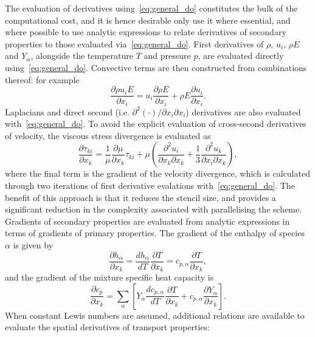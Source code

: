 \documentclass[notitlepage]{revtex4-1}
\begin{document}
The evaluation of derivatives using~\eqref{eq:general_do} constitutes the bulk of the computational cost, and it is hence desirable only use it where essential, and where possible to use analytic expressions to relate derivatives of secondary properties to those evaluated via~\eqref{eq:general_do}. First derivatives of $\rho$, ${u}_{i}$, $\rho{E}$ and ${Y}_{\alpha}$, alongside the temperature $T$ and pressure $p$, are evaluated directly using~\eqref{eq:general_do}. Convective terms are then constructed from combinations thereof: for example
\begin{equation}\frac{\partial\rho{u}_{i}E}{\partial{x}_{i}}=u_{i}\frac{\partial\rho{E}}{\partial{x}_{i}}+\rho{E}\frac{\partial{u}_{i}}{\partial{x}_{i}}.\end{equation}
Laplacians and direct second (i.e. $\partial^{2}\left(\cdot\right)/\partial{x}_{i}\partial{x}_{i}$) derivatives are also evaluated with~\eqref{eq:general_do}. To avoid the explicit evaluation of cross-second derivatives of velocity, the viscous stress divergence is evaluated as
\begin{equation}\frac{\partial\tau_{ki}}{\partial{x}_{k}}=\frac{1}{\mu}\frac{\partial\mu}{\partial{x}_{k}}\tau_{ki}+\mu\left(\frac{\partial^{2}{u}_{i}}{\partial{x}_{k}\partial{x}_{k}}+\frac{1}{3}\frac{\partial^{2}{u}_{k}}{\partial{x}_{i}\partial{x}_{k}}\right)\label{eq:divtau},\end{equation}
where the final term is the gradient of the velocity divergence, which is calculated through two iterations of first derivative evalations with~\eqref{eq:general_do}. The benefit of this approach is that it reduces the stencil size, and provides a significant reduction in the complexity associated with parallelising the scheme. Gradients of secondary properties are evaluated from analytic expressions in terms of gradients of primary properties. The gradient of the enthalpy of species $\alpha$ is given by
\begin{equation}\frac{\partial{h}_{\alpha}}{\partial{x}_{k}}=\frac{dh_{\alpha}}{dT}\frac{\partial{T}}{\partial{x}_{k}}=c_{p,\alpha}\frac{\partial{T}}{\partial{x}_{k}},\end{equation}
and the gradient of the mixture specific heat capacity is
\begin{equation}\frac{\partial{c}_{p}}{\partial{x}_{k}}=\displaystyle\sum_{\alpha}\left[Y_{\alpha}\frac{dc_{p,\alpha}}{dT}\frac{\partial{T}}{\partial{x}_{k}}+c_{p,\alpha}\frac{\partial{Y}_{\alpha}}{\partial{x}_{k}}\right].\end{equation}
When constant Lewis numbers are assumed, additional relations are available to evaluate the spatial derivatives of transport properties:
\end{document}

